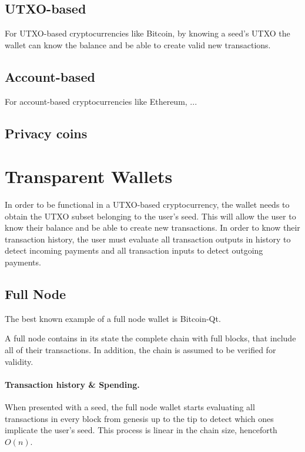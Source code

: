 \documentclass[sigconf]{acmart}
\begin{document}
\subsection{UTXO-based}
For UTXO-based cryptocurrencies like Bitcoin, by knowing a seed's UTXO the wallet can know the balance and be able to create valid new transactions.

\subsection{Account-based}
For account-based cryptocurrencies like Ethereum, ...

\subsection{Privacy coins}

\section{Transparent Wallets}

In order to be functional in a UTXO-based cryptocurrency, the wallet needs to obtain the UTXO subset belonging to the user's seed. This will allow the user to know their balance and be able to create new transactions. In order to know their transaction history, the user must evaluate all transaction outputs in history to detect incoming payments and all transaction inputs to detect outgoing payments.

\subsection{Full Node}
The best known example of a full node wallet is Bitcoin-Qt.

A full node contains in its state the complete chain with full blocks, that include all of their transactions. In addition, the chain is assumed to be verified for validity.

\paragraph{Transaction history \& Spending.}
When presented with a seed, the full node wallet starts evaluating all transactions in every block from genesis up to the tip to detect which ones implicate the user's seed. This process is linear in the chain size, henceforth $O(n)$.
\end{document}
